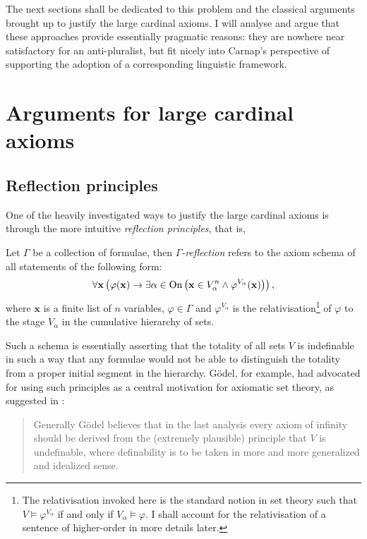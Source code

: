 \documentclass[12pt]{article}
\theoremstyle{plain}
\theoremstyle{definition}
\newcommand{\On}{\mathrm{On}}
\begin{document}
The next sections shall be dedicated to this problem and the classical arguments brought up to justify the large cardinal axioms. I will analyse and argue that these approaches provide essentially pragmatic reasons: they are nowhere near satisfactory for an anti-pluralist, but fit nicely into Carnap's perspective of supporting the adoption of a corresponding linguistic framework.

\section{Arguments for large cardinal axioms}

\subsection{Reflection principles}

One of the heavily investigated ways to justify the large cardinal axioms is through the more intuitive \emph{reflection principles}, that is,

\begin{definition}
	Let $\Gamma$ be a collection of formulae, then \emph{$\Gamma$-reflection} refers to the axiom schema of all statements of the following form:
	\[\forall \mathbf{x} \left(\varphi\mleft(\mathbf{x}\mright) \rightarrow \exists \alpha \in \On \left(\mathbf{x} \in V_\alpha^n \land \varphi^{V_\alpha}\mleft(\mathbf{x}\mright)\right)\right),\]
	where $\mathbf{x}$ is a finite list of $n$ variables, $\varphi \in \Gamma$ and $\varphi^{V_\alpha}$ is the relativisation\footnote{The relativisation	invoked here is the standard notion in set theory such that $V \vDash \varphi^{V_\alpha}$ if and only if $V_\alpha \vDash \varphi$. I shall account for the relativisation of a sentence of higher-order in more details later.} of $\varphi$ to the stage $V_\alpha$ in the cumulative hierarchy of sets.
\end{definition}

Such a schema is essentially asserting that the totality of all sets $V$ is indefinable in such a way that any formulae would not be able to distinguish the totality from a proper initial segment in the hierarchy. G\"odel, for example, had advocated for using such principles as a central motivation for axiomatic set theory, as suggested in \cite{wang-large-sets}:

\begin{quote}
	Generally G\"odel believes that in the last analysis every axiom of infinity should be derived from the (extremely plausible) principle that $V$ is undefinable, where definability is to be taken in more and more generalized and idealized sense.
\end{quote}
\end{document}
